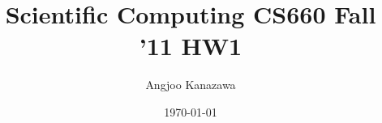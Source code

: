 \documentclass[a4paper]{article}
\begin{document}
\title{Scientific Computing CS660 Fall '11 HW1}
\author{Angjoo Kanazawa}
\date{\today}
\maketitle
\end{document}
